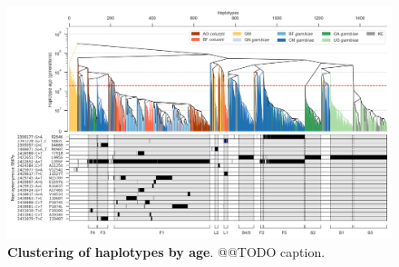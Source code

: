 \documentclass[a4paper,11pt,abstracton,hidelinks]{scrartcl}
\begin{document}
\clearpage
 
%
\begin{figure}[!t]
  \includegraphics[width=1.1\linewidth,center]{artwork/fig_hap_tree.png}
  \caption{\textbf{Clustering of haplotypes by age}. @@TODO caption.}
  \label{fig:tree}
\end{figure}
\end{document}
